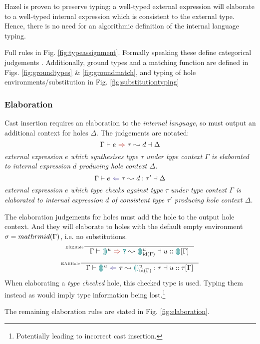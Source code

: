 Hazel is proven to preserve typing; a well-typed external expression will elaborate to a well-typed internal expression which is consistent to the external type. Hence, there is no need for an algorithmic definition of the internal language typing.

Full rules in Fig. \ref{fig:typeassignment}. Formally speaking these define categorical judgements \cite{ModalJudgements}. Additionally, ground types and a matching function are defined in Figs. \ref{fig:groundtypes} \& \ref{fig:groundmatch}, and typing of hole environments/substitution in Fig. \ref{fig:substitutiontyping}
\subsubsection{Elaboration}\label{sec:HazelElaboration}
Cast insertion requires an elaboration to the \textit{internal language}, so must output an additional context for holes $\Delta$. The judgements are notated: \[\elaborationSynthesis{e}{\tau}{d}{\Delta}\]\textit{
external expression $e$ which synthesises type $\tau$ under type context $\Gamma$ is elaborated to internal expression $d$ producing hole context $\Delta$. }
\[\elaborationAnalysis{e}{\tau}{d}{\tau'}{\Delta}\]\textit{
external expression $e$ which type checks against type $\tau$ under type context $\Gamma$ is elaborated to internal expression $d$ of consistent type $\tau'$ producing hole context $\Delta$.}

The elaboration judgements for holes must add the hole to the output hole context. And they will elaborate to holes with the default empty environment $\sigma = \\mathrm{id}(\Gamma)$, i.e. no substitutions.
\[\inference[\tiny ESEHole]{}{\elaborationSynthesis{\hole^u}{\dyn}{\hole^u_{\mathrm{id}(\Gamma)}}{u :: \hole[] [\Gamma]}}\]
\[\inference[\tiny EAEHole]{}{\elaborationAnalysis{\hole^u}{\tau}{\hole^u_{\mathrm{id}(\Gamma)}}{\tau}{u::\tau[\Gamma]}}\]
When elaborating a \textit{type checked} hole, this checked type is used. Typing them instead as {\dyn} would imply type information being lost.\footnote{Potentially leading to incorrect cast insertion.}

The remaining elaboration rules are stated in Fig. \ref{fig:elaboration}.

